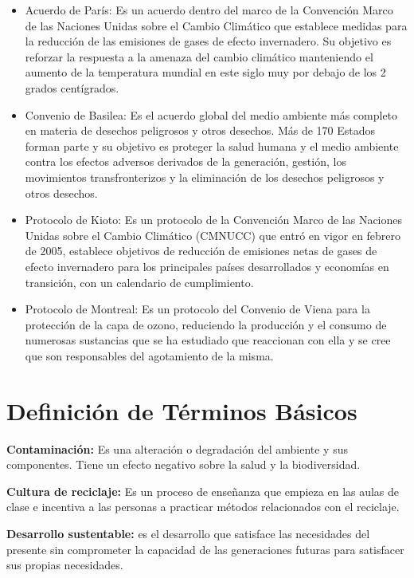 \begin{itemize}
    \item Acuerdo de París: Es un acuerdo dentro del marco de la Convención Marco de las Naciones Unidas sobre el Cambio Climático que establece medidas para la reducción de las emisiones de gases de efecto invernadero. Su objetivo es reforzar la respuesta  a la amenaza del cambio climático manteniendo el aumento de la temperatura mundial en este siglo muy por debajo de los 2 grados centígrados.

    \item Convenio de Basilea: Es el acuerdo global del medio ambiente más completo en materia de desechos peligrosos y otros desechos. Más de 170 Estados forman parte y su objetivo es proteger la salud humana y el medio ambiente contra los efectos adversos derivados de la generación, gestión, los movimientos transfronterizos y la eliminación de los desechos peligrosos y otros desechos. 
    
    \item Protocolo de Kioto: Es un protocolo de la Convención Marco de las Naciones Unidas sobre el Cambio Climático (CMNUCC) que entró en vigor en febrero de 2005, establece objetivos de reducción de emisiones netas de gases de efecto invernadero para los principales países desarrollados y economías en transición, con un calendario de cumplimiento.
    
    \item Protocolo de Montreal: Es un protocolo del Convenio de Viena para la protección de la capa de ozono, reduciendo la producción y el consumo de numerosas sustancias que se ha estudiado que reaccionan con ella y se cree que son responsables del agotamiento de la misma.
\end{itemize}

\newpage

\section{Definición de Términos Básicos}

\textbf{Contaminación:} Es una alteración o degradación del ambiente y sus componentes. Tiene un efecto negativo sobre la salud y la biodiversidad.

\textbf{Cultura de reciclaje:} Es un proceso de enseñanza que empieza en las aulas de clase e incentiva a las personas a practicar métodos relacionados con el reciclaje.

\textbf{Desarrollo sustentable:} es el desarrollo que satisface las necesidades del presente sin comprometer la capacidad de las generaciones futuras para satisfacer sus propias necesidades.

